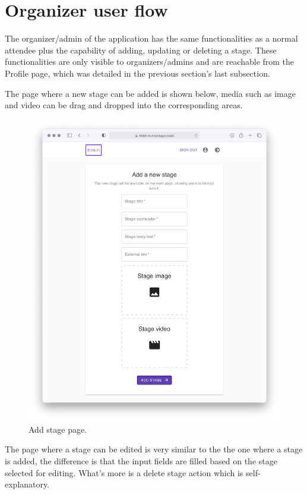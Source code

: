 \section{Organizer user flow}

The organizer/admin of the application has the same functionalities as a normal attendee plus the capability of adding, updating or deleting a stage. These functionalities are only visible to organizers/admins and are reachable from the Profile page, which was detailed in the previous section's last subsection. 

The page where a new stage can be added is shown below, media such as image and video can be drag and dropped into the corresponding areas.

\begin{figure}[H]
	\centering
	\includegraphics[width=\textwidth,keepaspectratio]{images/business_logic/stages_add.png}
	\caption{Add stage page.}
	\label{figure:add-stage-page}
\end{figure}

The page where a stage can be edited is very similar to the the one where a stage is added, the difference is that the input fields are filled based on the stage selected for editing. What's more is a delete stage action which is self-explanatory.

